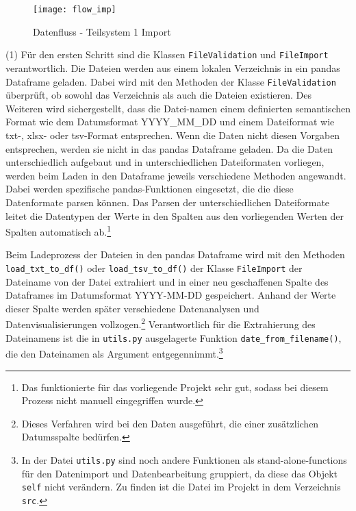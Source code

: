    \begin{figure}[H]
        \centering
            \texttt{[image: flow\_imp]}
            \caption{Datenfluss - Teilsystem 1 Import}
            \label{fig:flow import}
    \end{figure}

    
    (1) Für den ersten Schritt sind die Klassen \texttt{FileValidation} und \texttt{FileImport} verantwortlich.
    Die Dateien werden aus einem lokalen Verzeichnis in ein pandas Dataframe geladen. 
    Dabei wird mit den Methoden der Klasse \texttt{FileValidation} überprüft, ob sowohl das Verzeichnis als auch die Dateien existieren. 
    Des Weiteren wird sichergestellt, dass die Datei-namen einem definierten semantischen Format wie dem Datumsformat YYYY\_MM\_DD und 
    einem Dateiformat wie txt-, xlsx- oder tsv-Format entsprechen. Wenn die Daten nicht diesen Vorgaben entsprechen, werden sie nicht in
    das pandas Dataframe geladen. Da die Daten unterschiedlich aufgebaut und in unterschiedlichen Dateiformaten vorliegen, 
    werden beim Laden in den Dataframe jeweils verschiedene Methoden angewandt. Dabei werden spezifische pandas-Funktionen eingesetzt,
    die die diese Datenformate parsen können. Das Parsen der unterschiedlichen Dateiformate leitet die Datentypen der Werte in den Spalten
    aus den vorliegenden Werten der Spalten automatisch ab.\footnote{Das funktionierte für das vorliegende Projekt sehr gut, sodass
    bei diesem Prozess nicht manuell eingegriffen wurde.}
    
    Beim Ladeprozess der Dateien in den pandas Dataframe wird mit den Methoden \texttt{load\_txt\_to\_df()} oder \texttt{load\_tsv\_to\_df()} 
    der Klasse \texttt{FileImport} der Dateiname von der Datei extrahiert und in einer neu geschaffenen Spalte des Dataframes im Datumsformat YYYY-MM-DD gespeichert.
    Anhand der Werte dieser Spalte werden später verschiedene Datenanalysen und Datenvisualisierungen vollzogen.\footnote{Dieses Verfahren wird bei den Daten ausgeführt, die einer zusätzlichen Datumsspalte bedürfen.} 
    Verantwortlich für die Extrahierung des Dateinamens ist die in \texttt{utils.py} ausgelagerte Funktion \texttt{date\_from\_filename()},
    die den Dateinamen als Argument entgegennimmt.\footnote{In der Datei \texttt{utils.py} sind noch andere Funktionen als stand-alone-functions für den Datenimport und Datenbearbeitung gruppiert,
    da diese das Objekt \texttt{self} nicht verändern. Zu finden ist die Datei im Projekt in dem Verzeichnis \texttt{src}.} 
    
